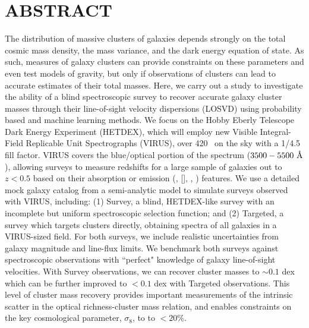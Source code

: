 %
%
%

\chapter*{ABSTRACT}

\pagestyle{plain} %
\setcounter{page}{2}

\indent The distribution of massive clusters of galaxies depends strongly on the total cosmic mass density, the mass variance, and the dark energy equation of state. As such, measures of galaxy clusters can provide constraints on these parameters and even test models of gravity, but only if observations of clusters can lead to accurate estimates of their total masses. Here, we carry out a study to investigate the ability of a blind spectroscopic survey to recover accurate galaxy cluster masses through their line-of-sight velocity dispersions (LOSVD) using probability based and machine learning methods. We focus on the Hobby Eberly Telescope Dark Energy Experiment (HETDEX), which will employ new Visible Integral-Field Replicable Unit Spectrographs (VIRUS), over 420 \degsq\ on the sky with a 1/4.5 fill factor. VIRUS covers the blue/optical portion of the spectrum ($3500-5500~\hbox{\AA}$), allowing surveys to measure redshifts for a large sample of galaxies out to $z < 0.5$ based on their absorption or emission (\eg, [], , ) features. We use a detailed mock galaxy catalog from a semi-analytic model to simulate surveys observed with VIRUS, including: (1) Survey, a blind, HETDEX-like survey with an incomplete but uniform spectroscopic selection function; and (2) Targeted, a survey which targets clusters directly, obtaining spectra of all galaxies in a VIRUS-sized field. For both surveys, we include realistic uncertainties from galaxy magnitude and line-flux limits. We benchmark both surveys against spectroscopic observations with ``perfect" knowledge of galaxy line-of-sight velocities. With Survey observations, we can recover cluster masses to $\sim0.1$ dex which can be further improved to $<0.1$ dex with Targeted observations. This level of cluster mass recovery provides important measurements of the intrinsic scatter in the optical richness-cluster mass relation, and enables constraints on the key cosmological parameter, $\sigma_8$, to to $<20$\%.

